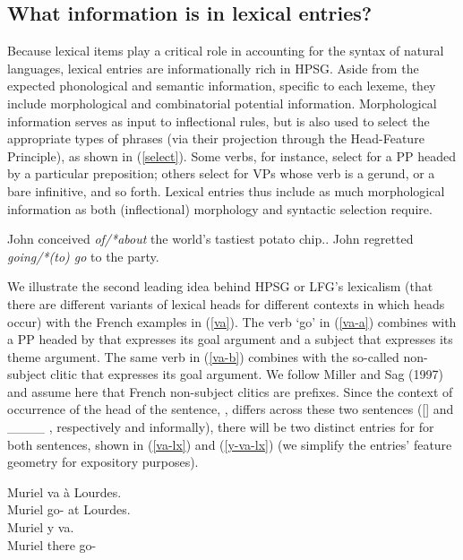 \documentclass[output=paper]{langsci/langscibook}
\begin{document}
\subsection{What information is in lexical entries?}

Because lexical items play a critical role in accounting for the syntax of natural languages, lexical entries are informationally rich in HPSG. Aside from the expected phonological and semantic information, specific to each lexeme, they include morphological and combinatorial potential information. Morphological information serves as input to inflectional rules, but is also used to select the appropriate types of phrases (via their projection through the Head-Feature Principle), as shown in (\ref{select}). Some verbs, for instance, select for a PP headed by a particular preposition; others select for VPs whose verb is a gerund, or a bare infinitive, and so forth. Lexical entries thus include as much morphological information as both (inflectional) morphology and syntactic selection require.

\begin{exe}
\ex\label{select}
\begin{xlist}
	\ex\label{select-a}John conceived \emph{of/*about} the world's tastiest potato chip..
	\ex\label{select-b} John regretted \emph{going/*(to) go} to the party.
	\end{xlist}
\end{exe} 


We illustrate the second leading idea behind HPSG or LFG's lexicalism (that there are different variants of lexical heads for different contexts in which heads occur) with the French examples in (\ref{va}). The verb  `go' in (\ref{va-a}) combines with a PP headed by  that expresses its goal argument and a subject that expresses its theme argument. The same verb in (\ref{va-b}) combines with the so-called non-subject clitic  that expresses its goal argument. We follow Miller and Sag (1997) and assume here that French non-subject clitics are prefixes. Since the context of occurrence of the head of the sentence, , differs across these two sentences ([] and  \_\_\_\_ , respectively and informally), there will be two distinct entries for  for both sentences, shown in (\ref{va-lx}) and (\ref{y-va-lx}) (we simplify the entries' feature geometry for expository purposes).


\begin{exe}
\ex\label{va}
\begin{xlist}
	\ex\label{va-a} \gll Muriel va à Lourdes. \\
	Muriel go- at Lourdes. \\
	\ex\label{va-b} \gll Muriel y va. \\
	Muriel there go- \\
\end{xlist}	
\end{exe}
\end{document}
